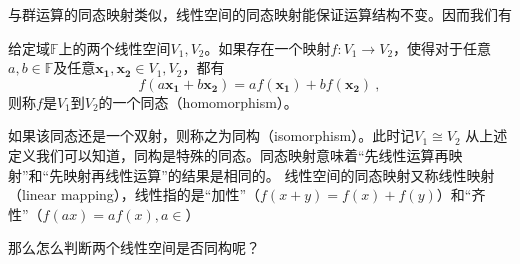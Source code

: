 

与群运算的同态映射类似，线性空间的同态映射能保证运算结构不变。因而我们有
\begin{definition}{}
给定域$\mathbb F$上的两个线性空间$V_1,V_2$。如果存在一个映射$f:V_1\rightarrow V_2$，使得对于任意$a,b\in \mathbb F$及$任意\boldsymbol{x_1,x_2}\in V_1,V_2$，都有
\begin{equation}
f(a\boldsymbol {x_1}+b\boldsymbol {x_2})=af(\boldsymbol {x_1})+bf(\boldsymbol {x_2})~,
\end{equation}
则称$f$是$V_1$到$V_2$的一个同态（homomorphism）。
\end{definition}
如果该同态还是一个双射，则称之为同构（isomorphism）。此时记$V_1\cong V_2$
从上述定义我们可以知道，同构是特殊的同态。同态映射意味着“先线性运算再映射”和“先映射再线性运算”的结果是相同的。
线性空间的同态映射又称线性映射（linear mapping），线性指的是“加性”（$f(x+y)=f(x)+f(y)$）和“齐性”（$f(ax)=af(x),a\in $）

那么怎么判断两个线性空间是否同构呢？